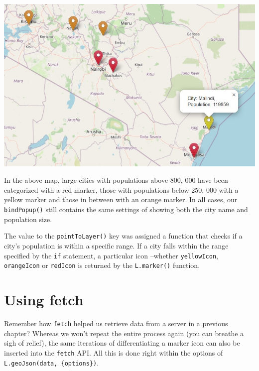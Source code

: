 \documentclass[
]{book}
\begin{document}
\includegraphics{../images/geojson-diff2.jpg}

In the above map, large cities with populations above 800, 000 have been categorized with a red marker, those with populations below 250, 000 with a yellow marker and those in between with an orange marker. In all cases, our \texttt{bindPopup()} still contains the same settings of showing both the city name and population size.

The value to the \texttt{pointToLayer()} key was assigned a function that checks if a city's population is within a specific range. If a city falls within the range specified by the \texttt{if} statement, a particular icon --whether \texttt{yellowIcon}, \texttt{orangeIcon} or \texttt{redIcon} is returned by the \texttt{L.marker()} function.

\hypertarget{using-fetch}{%
\section{Using fetch}\label{using-fetch}}

Remember how \texttt{fetch} helped us retrieve data from a server in a previous chapter? Whereas we won't repeat the entire process again (you can breathe a sigh of relief), the same iterations of differentiating a marker icon can also be inserted into the \texttt{fetch} API. All this is done right within the options of \texttt{L.geoJson(data,\ \{options\})}.
\end{document}

